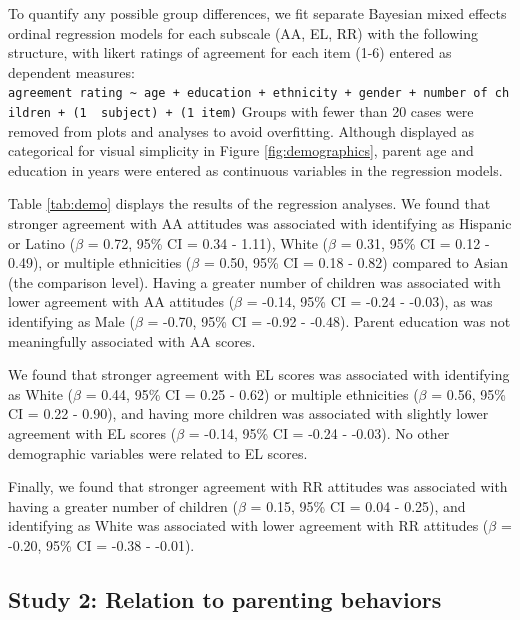 \documentclass[man]{apa6}
\theoremstyle{definition}
\theoremstyle{definition}
\theoremstyle{definition}
\theoremstyle{remark}
\begin{document}
To quantify any possible group differences, we fit separate Bayesian
mixed effects ordinal regression models for each subscale (AA, EL, RR)
with the following structure, with likert ratings of agreement for each
item (1-6) entered as dependent measures:
\texttt{agreement\ rating\ \textasciitilde{}\ age\ +\ education\ +\ ethnicity\ +\ gender\ +\ number\ of\ children\ +\ (1\ \textbar{}\ subject)\ +\ (1\textbar{}\ item)}
Groups with fewer than 20 cases were removed from plots and analyses to
avoid overfitting. Although displayed as categorical for visual
simplicity in Figure \ref{fig:demographics}, parent age and education in
years were entered as continuous variables in the regression models.

Table \ref{tab:demo} displays the results of the regression analyses. We
found that stronger agreement with AA attitudes was associated with
identifying as Hispanic or Latino (\(\beta\) = 0.72, 95\% CI = 0.34 -
1.11), White (\(\beta\) = 0.31, 95\% CI = 0.12 - 0.49), or multiple
ethnicities (\(\beta\) = 0.50, 95\% CI = 0.18 - 0.82) compared to Asian
(the comparison level). Having a greater number of children was
associated with lower agreement with AA attitudes (\(\beta\) = -0.14,
95\% CI = -0.24 - -0.03), as was identifying as Male (\(\beta\) = -0.70,
95\% CI = -0.92 - -0.48). Parent education was not meaningfully
associated with AA scores.

We found that stronger agreement with EL scores was associated with
identifying as White (\(\beta\) = 0.44, 95\% CI = 0.25 - 0.62) or
multiple ethnicities (\(\beta\) = 0.56, 95\% CI = 0.22 - 0.90), and
having more children was associated with slightly lower agreement with
EL scores (\(\beta\) = -0.14, 95\% CI = -0.24 - -0.03). No other
demographic variables were related to EL scores.

Finally, we found that stronger agreement with RR attitudes was
associated with having a greater number of children (\(\beta\) = 0.15,
95\% CI = 0.04 - 0.25), and identifying as White was associated with
lower agreement with RR attitudes (\(\beta\) = -0.20, 95\% CI = -0.38 -
-0.01).

\subsection{Study 2: Relation to parenting
behaviors}\label{study-2-relation-to-parenting-behaviors}
\end{document}
